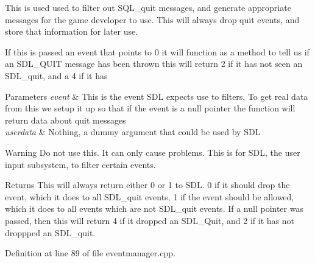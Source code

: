 This is used used to filter out SQL\_\-quit messages, and generate appropriate messages for the game developer to use. This will always drop quit events, and store that information for later use. \par
 If this is passed an event that points to 0 it will function as a method to tell us if an SDL\_\-QUIT message has been thrown this will return 2 if it has not seen an SDL\_\-quit, and a 4 if it has 
\begin{DoxyParams}{Parameters}
{\em event} & This is the event SDL expects use to filters, To get real data from this we setup it up so that if the event is a null pointer the function will return data about quit messages \\
\hline
{\em userdata} & Nothing, a dummy argument that could be used by SDL \\
\hline
\end{DoxyParams}
\begin{DoxyWarning}{Warning}
Do not use this. It can only cause problems. This is for SDL, the user input subsystem, to filter certain events. 
\end{DoxyWarning}
\begin{DoxyReturn}{Returns}
This will always return either 0 or 1 to SDL. 0 if it should drop the event, which it does to all SDL\_\-quit events, 1 if the event should be allowed, which it does to all events which are not SDL\_\-quit events. If a null pointer was passed, then this will return 4 if it dropped an SDL\_\-Quit, and 2 if it has not droppped an SDL\_\-quit. 
\end{DoxyReturn}


Definition at line 89 of file eventmanager.cpp.


